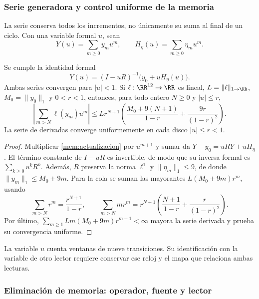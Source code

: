 \subsubsection{Serie generadora y control uniforme de la memoria}

La serie conserva todos los incrementos, no únicamente su suma al final
de un ciclo. Con una variable formal \(u\), sean
\[
 Y(u)=\sum_{m\geq0}y_mu^m,\qquad
 H_\eta(u)=\sum_{m\geq0}\eta_mu^m.
\]

\begin{proposition}
\label{mem:prop-serie}
Se cumple la identidad formal
\begin{equation}
 Y(u)=(I-uR)^{-1}\bigl(y_0+uH_\eta(u)\bigr).
 \label{mem:serie}
\end{equation}
Ambas series convergen para \(|u|<1\). Si \(\ell:\RR^{12}\to\RR\)
es lineal, \(L=\|\ell\|_{1\to\RR}\), \(M_0=\|y_0\|_1\) y
\(0<r<1\), entonces, para todo entero \(N\geq0\) y \(|u|\leq r\),
\begin{equation}
 \left|\sum_{m>N}\ell(y_m)u^m\right|
 \leq Lr^{N+1}\left(
 \frac{M_0+9(N+1)}{1-r}+\frac{9r}{(1-r)^2}\right).
 \label{mem:cota}
\end{equation}
La serie de derivadas converge uniformemente en cada disco
\(|u|\leq r<1\).
\end{proposition}
\begin{proof}
Multiplicar \eqref{mem:actualizacion} por \(u^{m+1}\) y sumar da
\(Y-y_0=uRY+uH_\eta\). El término constante de \(I-uR\) es
invertible, de modo que su inversa formal es \(\sum_{k\geq0}u^kR^k\).
Además, \(R\) preserva la norma \(\ell^1\) y
\(\|\eta_m\|_1\leq9\), de donde
\(\|y_m\|_1\leq M_0+9m\).
Para la cola se suman las mayorantes
\(L(M_0+9m)r^m\), usando
\[
 \sum_{m>N}r^m=\frac{r^{N+1}}{1-r},\qquad
 \sum_{m>N}mr^m=r^{N+1}
 \left(\frac{N+1}{1-r}+\frac r{(1-r)^2}\right).
\]
Por último, \(\sum_{m\geq1}Lm(M_0+9m)r^{m-1}<\infty\)
mayora la serie derivada y prueba su convergencia uniforme.
\end{proof}

La variable \(u\) cuenta ventanas de nueve transiciones. Su identificación
con la variable de otro lector requiere conservar ese reloj y el mapa
que relaciona ambas lecturas.

\subsubsection{Eliminación de memoria: operador, fuente y lector}

